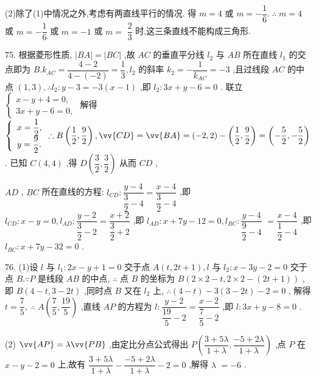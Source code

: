 (2)除了(1)中情况之外,考虑有两直线平行的情况. 得 $m = 4$ 或 $m =  - \dfrac{1}{6}.\;\therefore \;m = 4$ 或 $m =  - \dfrac{1}{6}$ 或 $m =  - 1$ 或 $m =$  $\dfrac{2}{3}$ 时,这三条直线不能构成三角形.

75. 根据菱形性质, $\left| {BA}\right|  = \left| {BC}\right|$ ,故 ${AC}$ 的垂直平分线 ${l}_{2}$ 与 ${AB}$ 所在直线 ${l}_{1}$ 的交点即为 $B.{k}_{AC} = \dfrac{4 - 2}{4 - \left( {-2}\right) } = \dfrac{1}{3},{l}_{2}$ 的斜率 ${k}_{2} =  - \dfrac{1}{{k}_{AC}} =  - 3$ ,且过线段 ${AC}$ 的中点 $\left( {1,3}\right) ,\therefore {l}_{2} : y - 3 =  - 3\left( {x - 1}\right)$ ,即 ${l}_{2} : {3x} + y - 6 = 0$ . 联立 $\left\{  \begin{array}{l} x - y + 4 = 0, \\  {3x} + y - 6 = 0, \end{array}\right.$ 解得 $\left\{  {\begin{array}{l} x = \dfrac{1}{2}, \\  y = \dfrac{9}{2}. \end{array}\therefore B\left( {\dfrac{1}{2},\dfrac{9}{2}}\right) ,\vv{CD} = \vv{BA} = \left( {-2,2}\right)  - \left( {\dfrac{1}{2},\dfrac{9}{2}}\right)  = \left( {-\dfrac{5}{2}, - \dfrac{5}{2}}\right) }\right.$ . 已知 $C\left( {4,4}\right)$ ,得 $D\left( {\dfrac{3}{2},\dfrac{3}{2}}\right)$ 从而 ${CD}$ ,

${AD}$ , ${BC}$ 所在直线的方程: ${l}_{CD} : \dfrac{y - 4}{\dfrac{3}{2} - 4} = \dfrac{x - 4}{\dfrac{3}{2} - 4}$ ,即 ${l}_{CD} : x - y = 0,{l}_{AD} : \dfrac{y - 2}{\dfrac{3}{2} - 2} = \dfrac{x + 2}{\dfrac{3}{2} + 2}$ ,即 ${l}_{AD} : x + {7y} - {12} = 0,{l}_{BC} : \dfrac{y - 4}{\dfrac{9}{2} - 4}$  $= \dfrac{x - 4}{\dfrac{1}{2} - 4}$ ,即 ${l}_{BC} : x + {7y} - {32} = 0$ .

76. (1)设 $l$ 与 ${l}_{1} : {2x} - y + 1 = 0$ 交于点 $A\left( {t,{2t} + 1}\right) ,l$ 与 ${l}_{2} : x - {3y} - 2 = 0$ 交于点 $B.\because P$ 是线段 ${AB}$ 的中点, $\therefore$ 点 $B$ 的坐标为 $B\left( {2 \times  2 - t,2 \times  2 - \left( {{2t} + 1}\right) }\right)$ ,即 $B\left( {4 - t,3 - {2t}}\right)$ ,同时点 $B$ 又在 ${l}_{2}$ 上, $\therefore \left( {4 - t}\right)  - 3\left( {3 - {2t}}\right)  - 2 = 0$ , 解得 $t = \dfrac{7}{5},\;\therefore \;A\left( {\dfrac{7}{5},\dfrac{19}{5}}\right)$ ,直线 ${AP}$ 的方程为 $l : \dfrac{y - 2}{\dfrac{19}{5} - 2} = \dfrac{x - 2}{\dfrac{7}{5} - 2}$ ,即 $l : {3x} + y - 8 = 0$ .

(2) $\vv{AP} = \lambda \vv{PB}$ ,由定比分点公式得出 $P\left( {\dfrac{3 + {5\lambda }}{1 + \lambda },\dfrac{-5 + {2\lambda }}{1 + \lambda }}\right)$ ,点 $P$ 在 $x - y - 2 = 0$ 上,故有 $\dfrac{3 + {5\lambda }}{1 + \lambda } - \dfrac{-5 + {2\lambda }}{1 + \lambda } - 2 = 0$ ,解得 $\lambda$  $=  - 6$ .

